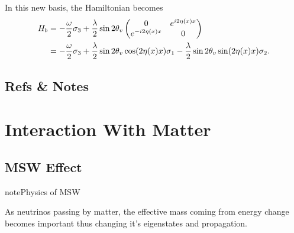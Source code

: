 \documentclass[letterpaper,12pt,english]{sphinxmanual}
\begin{document}
In this new basis, the Hamiltonian becomes
\begin{gather}
\begin{split}H_b &= - \frac{\omega}{2} \sigma_3 + \frac{\lambda}{2} \sin 2\theta_v \begin{pmatrix} 0 & e^{i 2\eta(x) x} \\ e^{ - i 2\eta(x) x} & 0  \end{pmatrix} \\
& =  - \frac{\omega}{2} \sigma_3 + \frac{\lambda}{2}\sin 2\theta_v \cos ( 2\eta(x) x )\sigma_1 - \frac{\lambda}{2} \sin 2\theta_v \sin (2\eta(x) x) \sigma_2.\end{split}\notag
\end{gather}

\section{Refs \& Notes}
\label{basis:refs-notes}

\chapter{Interaction With Matter}
\label{msw:interaction-with-matter}\label{msw::doc}

\section{MSW Effect}
\label{msw:index-0}\label{msw:msw-effect}
\begin{notice}{note}{Physics of MSW}

As neutrinos passing by matter, the effective mass coming from energy change becomes important thus changing it's eigenstates and propagation.
\end{notice}
\end{document}
